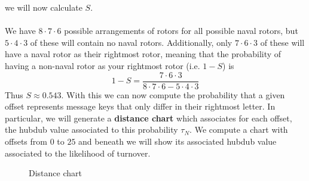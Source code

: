   we will now calculate $S$.
  \\\\We have $8\cdot7\cdot6$ possible arrangements of rotors for all
  possible naval rotors, but $5\cdot4\cdot3$ of these will contain no
  naval rotors. Additionally, only $7\cdot6\cdot3$ of these will have
  a naval rotor as their rightmost rotor, meaning that the
  probability of having a non-naval rotor as your rightmost rotor
  (i.e. $1-S$) is
  \[
    1-S = \frac{7\cdot6\cdot3}{8\cdot7\cdot6 - 5\cdot4\cdot3}
  \]
  Thus $S\approx0.543$. With this we can now compute the probability
  that a given offset represents message keys that only differ in
  their rightmost letter. In particular, we will generate a
  {\bf{distance chart}} which associates for each offset, the hubdub
  value associated to this probability $\tau_N$. We compute a chart
  with offsets from $0$ to $25$ and beneath we will show its
  associated hubdub value associated to the likelihood of turnover.
  \begin{figure}[H]
    \begin{center}
    \end{center}
    \caption{Distance chart}
    \label{fig:distance_chart}
  \end{figure}
